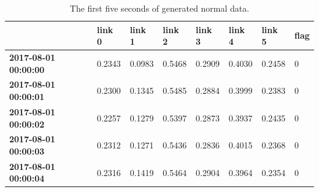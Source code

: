 \documentclass[5p]{elsarticle}
\begin{document}
\begin{table}[htbp]
\centering
\caption{The first five seconds of generated normal data.}
\label{table:first5s}
\resizebox{\linewidth}{!} {%
\begin{tabular}{@{}llllllll@{}}
\toprule
                             & \textbf{link 0} & \textbf{link 1} & \textbf{link 2} & \textbf{link 3} & \textbf{link 4} & \textbf{link 5} & \textbf{flag} \\ \midrule
\textbf{2017-08-01 00:00:00} & 0.2343          & 0.0983          & 0.5468          & 0.2909          & 0.4030          & 0.2458          & 0             \\
\textbf{2017-08-01 00:00:01} & 0.2300          & 0.1345          & 0.5485          & 0.2884          & 0.3999          & 0.2383          & 0             \\
\textbf{2017-08-01 00:00:02} & 0.2257          & 0.1279          & 0.5397          & 0.2873          & 0.3937          & 0.2435          & 0             \\
\textbf{2017-08-01 00:00:03} & 0.2312          & 0.1271          & 0.5436          & 0.2836          & 0.4015          & 0.2368          & 0             \\
\textbf{2017-08-01 00:00:04} & 0.2316          & 0.1419          & 0.5464          & 0.2904          & 0.3964          & 0.2354          & 0             \\ \bottomrule
\end{tabular}%
}
\end{table}

\begin{table}[htbp]
\centering
\caption{The time period and features affected for each anomaly generated by the simulated data. Feature numbers were listed in descending order of significance towards the data.}
\label{table:aintervals}
\end{table}
\end{document}
